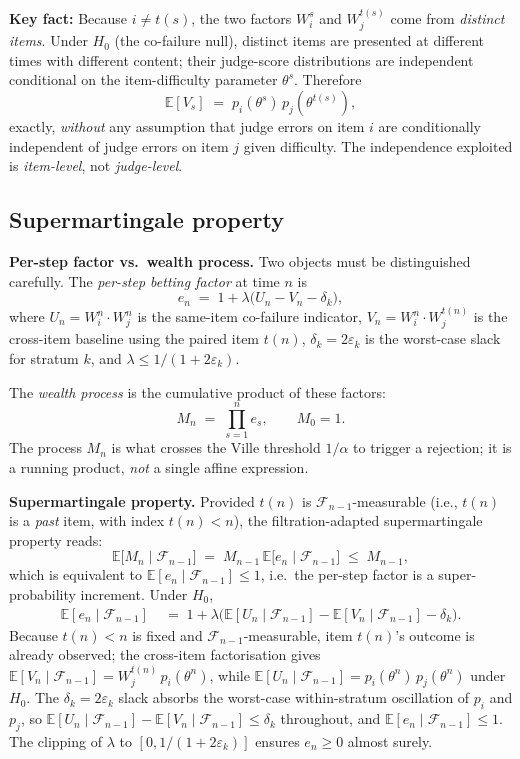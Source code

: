 \documentclass[11pt,a4paper]{article}
\begin{document}
\textbf{Key fact:}  Because $i \ne t(s)$, the two factors $W_i^s$ and
$W_j^{t(s)}$ come from \emph{distinct items}.  Under $H_0$ (the
co-failure null), distinct items are presented at different times with
different content; their judge-score distributions are independent
conditional on the item-difficulty parameter $\theta^s$.  Therefore
\[
  \mathbb{E}[V_s] \;=\; p_i(\theta^s)\,p_j(\theta^{t(s)}),
\]
exactly, \emph{without} any assumption that judge errors on item $i$
are conditionally independent of judge errors on item $j$ given
difficulty.  The independence exploited is \emph{item-level}, not
\emph{judge-level}.

\subsection{Supermartingale property}

\textbf{Per-step factor vs.\ wealth process.}
Two objects must be distinguished carefully.  The \emph{per-step betting
factor} at time $n$ is
\[
  e_n \;=\; 1 + \lambda\bigl(U_n - V_n - \delta_k\bigr),
\]
where $U_n = W_i^n \cdot W_j^n$ is the same-item co-failure indicator,
$V_n = W_i^n \cdot W_j^{t(n)}$ is the cross-item baseline using the
paired item $t(n)$, $\delta_k = 2\varepsilon_k$ is the worst-case slack
for stratum $k$, and $\lambda \le 1/(1 + 2\varepsilon_k)$.

The \emph{wealth process} is the cumulative product of these factors:
\[
  M_n \;=\; \prod_{s=1}^{n} e_s, \qquad M_0 = 1.
\]
The process $M_n$ is what crosses the Ville threshold $1/\alpha$ to
trigger a rejection; it is a running product, \emph{not} a single
affine expression.

\textbf{Supermartingale property.}
Provided $t(n)$ is $\mathcal{F}_{n-1}$-measurable (i.e., $t(n)$ is a
\emph{past} item, with index $t(n) < n$), the filtration-adapted
supermartingale property reads:
\[
  \mathbb{E}\bigl[M_n \mid \mathcal{F}_{n-1}\bigr]
  \;=\; M_{n-1}\,\mathbb{E}\bigl[e_n \mid \mathcal{F}_{n-1}\bigr]
  \;\le\; M_{n-1},
\]
which is equivalent to $\mathbb{E}[e_n \mid \mathcal{F}_{n-1}] \le 1$,
i.e.\ the per-step factor is a super-probability increment.  Under $H_0$,
\begin{align*}
  \mathbb{E}[e_n \mid \mathcal{F}_{n-1}]
  &\;=\; 1 + \lambda\bigl(
      \mathbb{E}[U_n \mid \mathcal{F}_{n-1}]
      - \mathbb{E}[V_n \mid \mathcal{F}_{n-1}]
      - \delta_k\bigr).
\end{align*}
Because $t(n) < n$ is fixed and $\mathcal{F}_{n-1}$-measurable, item
$t(n)$'s outcome is already observed; the cross-item factorisation gives
$\mathbb{E}[V_n \mid \mathcal{F}_{n-1}] = W_j^{t(n)}\,p_i(\theta^n)$,
while $\mathbb{E}[U_n \mid \mathcal{F}_{n-1}] = p_i(\theta^n)\,p_j(\theta^n)$
under $H_0$.  The $\delta_k = 2\varepsilon_k$ slack absorbs the worst-case
within-stratum oscillation of $p_i$ and $p_j$, so
$\mathbb{E}[U_n \mid \mathcal{F}_{n-1}] - \mathbb{E}[V_n \mid \mathcal{F}_{n-1}]
\le \delta_k$ throughout, and
$\mathbb{E}[e_n \mid \mathcal{F}_{n-1}] \le 1$.
The clipping of $\lambda$ to $[0, 1/(1 + 2\varepsilon_k)]$ ensures $e_n \ge 0$
almost surely.
\end{document}
